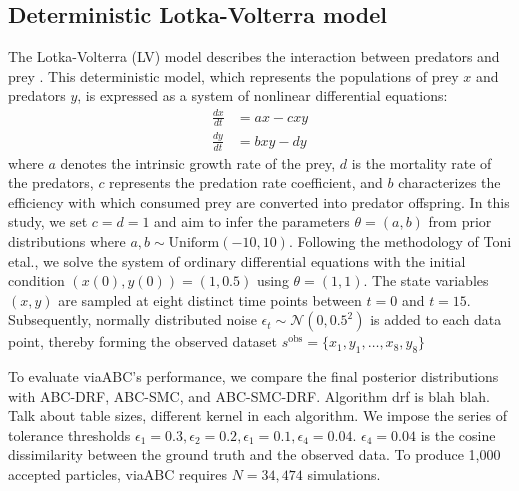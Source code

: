 \documentclass[12pt]{article} %
\begin{document}
\subsection*{Deterministic Lotka-Volterra model}
The Lotka-Volterra (LV) model describes the interaction between predators and prey \citep{lotka1925elements}\citep{volterra1928variations}. This deterministic model, which represents the populations of prey $x$ and predators $y$, is expressed as a system of nonlinear differential equations:
\begin{equation}
\begin{aligned}
\frac{dx}{dt} &= a x - cxy \\
\frac{dy}{dt} &= b xy - dy
\end{aligned}
\end{equation}
where $a$ denotes the intrinsic growth rate of the prey, $d$ is the mortality rate of the predators, $c$ represents the predation rate coefficient, and $b$ characterizes the efficiency with which consumed prey are converted into predator offspring. In this study, we set \(c = d = 1\) and aim to infer the parameters \(\theta = (a, b)\) from prior distributions where \(a, b \sim \mathrm{Uniform}(-10, 10)\). Following the methodology of Toni etal.\citep{toni2009approximate}, we solve the system of ordinary differential equations with the initial condition \((x(0), y(0)) = (1, 0.5)\) using \(\theta = (1, 1)\). The state variables \((x, y)\) are sampled at eight distinct time points between \(t = 0\) and \(t = 15\). Subsequently, normally distributed noise \(\epsilon_t \sim \mathcal{N}(0, 0.5^2)\) is added to each data point, thereby forming the observed dataset $s^{\mathrm{obs}} = \{x_1, y_1, \dots, x_8, y_8\}$

To evaluate viaABC's performance, we compare the final posterior distributions with ABC-DRF, ABC-SMC, and ABC-SMC-DRF. Algorithm drf is blah blah. Talk about table sizes, different kernel in each algorithm. We impose the series of tolerance thresholds $\epsilon_1 = 0.3, \epsilon_2 = 0.2, \epsilon_1 = 0.1, \epsilon_4 = 0.04$. $\epsilon_4 = 0.04$ is the cosine dissimilarity between the ground truth and the observed data. To produce 1,000 accepted particles, viaABC requires $N = 34,474$ simulations.
\end{document}
